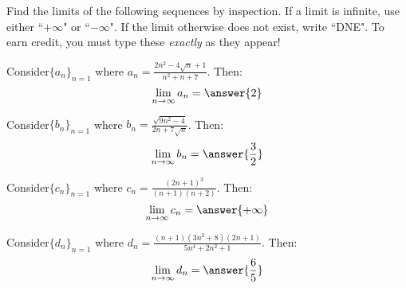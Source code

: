 \documentclass{ximera}
\author{Jim Talamo}
\begin{document}
\begin{exercise}

Find the limits of the following sequences by inspection.  If a limit is infinite, use either ``$+\infty$" or ``$-\infty$".  If the limit otherwise does not exist, write ``DNE".  To earn credit, you must type these \emph{exactly} as they appear!

\begin{exercise}
Consider$\{a_n \}_{n=1}$ where $a_n = \frac{2n^2-4\sqrt{n}+1}{n^2+n+7}$.  Then:
\[
\lim_{n \to \infty} a_n = \answer{2}
\]
\end{exercise}

\begin{exercise}
Consider$\{b_n \}_{n=1}$ where $b_n = \frac{\sqrt{9n^2-4}}{2n+7\sqrt{n}}$.  Then:
\[
\lim_{n \to \infty} b_n = \answer{\frac{3}{2}}
\]
\end{exercise}

\begin{exercise}
Consider$\{c_n \}_{n=1}$ where $c_n = \frac{(2n+1)^3}{(n+1)(n+2)}$.  Then:
\[
\lim_{n \to \infty} c_n = \answer{+\infty}
\]
\end{exercise}

\begin{exercise}
Consider$\{d_n \}_{n=1}$ where $d_n = \frac{(n+1)(3n^2+8)(2n+1)}{5n^4+2n^2+1}$.  Then:
\[
\lim_{n \to \infty} d_n = \answer{\frac{6}{5}}
\]
\end{exercise}


\end{exercise}
\end{document}
